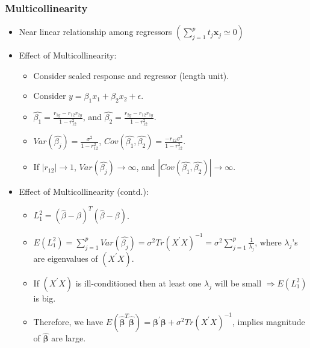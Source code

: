 \documentclass[10pt]{beamer} %
\begin{document}
\begin{frame}
   \frametitle{Multicollinearity}
   \begin{itemize}
      \item Near linear relationship among regressors $(\sum_{j=1}^p
         t_{j}\boldsymbol{x}_j \simeq 0)$
         \vspace{0.45cm}
      \item Effect of Multicollinearity:
         \begin{itemize}
            \item Consider scaled response and regressor (length unit).
               \vspace{0.35cm}
            \item Consider $y=\beta_1x_1+\beta_2x_2+\epsilon$.
               \vspace{0.35cm}
            \item $\hat{\beta_1}=\frac{r_{1y}-r_{12}r_{2y}}{1-r_{12}^2}$, and
               $\hat{\beta_2}=\frac{r_{2y}-r_{12}r_{1y}}{1-r_{12}^2}$.
               \vspace{0.35cm}
            \item $Var(\hat{\beta_{j}})=\frac{\sigma^2}{1-r_{12}^2}$,
               $Cov(\hat{\beta_1},\hat{\beta_2})=\frac{-r_{12}\sigma^2}{1-r_{12}^2}$.
               \vspace{0.35cm}
            \item If $|r_{12}| \rightarrow 1$, $Var(\hat{\beta_j}) \rightarrow
               \infty$, and $|Cov(\hat{\beta_1},\hat{\beta_2})| \rightarrow
               \infty$.
         \end{itemize}
   \end{itemize}
\end{frame}

\begin{frame}
   \begin{itemize}
      \item Effect of Multicollinearity (contd.):
         \begin{itemize}
            \item $L_1^2 = (\hat{\beta}-\beta)^{T}(\hat{\beta}-\beta)$.
               \vspace{0.35cm}
            \item $E(L_1^2)=\sum_{j=1}^p Var(\hat{\beta_j}) = \sigma^2
               Tr(X^{'}X)^{-1} = \sigma^2 \sum_{j=1}^p \frac{1}{\lambda_j}$,
               where $\lambda_j$'s are eigenvalues of $(X^{'}X)$.
               \vspace{0.35cm}
            \item If $(X^{'}X)$ is ill-conditioned then at least one $\lambda_j$
               will be small $\Rightarrow E(L_1^2)$ is big.
               \vspace{0.35cm}
            \item Therefore, we have
               $E(\hat{\boldsymbol{\beta}}^{T}\hat{\boldsymbol{\beta}}) =
               \boldsymbol{\beta}^{'}\boldsymbol{\beta} + \sigma^2
               Tr(X^{'}X)^{-1}$, implies magnitude of $\hat{\boldsymbol{\beta}}$
               are large.
         \end{itemize}    
   \end{itemize}
\end{frame}
\end{document}
